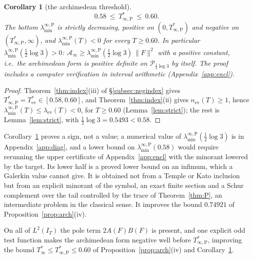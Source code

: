 \documentclass[11pt]{amsart}
\newtheorem{corollary}[theorem]{Corollary}
\theoremstyle{definition}
\theoremstyle{remark}
\newcommand{\IT}{I_T}
\newcommand{\Ainf}{\mathcal A_\infty}
\newcommand{\laminfP}{\lambda^{\infty,\mathrm P}_{\min}}
\begin{document}
\begin{corollary}[the archimedean threshold]\label{cor:Tarch}
\[
0.58\ \le\ T^*_{\infty,\mathrm P}\ \le\ 0.60 .
\]
The bottom $\laminfP$ is strictly decreasing, positive on $(0,T^*_{\infty,\mathrm P})$ and negative on
$(T^*_{\infty,\mathrm P},\infty)$, and $\laminfP(T)<0$ for every $T\ge0.60$. In particular
$\laminfP(\frac12\log3)>0$: $\Ainf\ge\laminfP(\frac12\log3)\,\|F\|^2$ with a positive constant, i.e.\
the archimedean form is positive definite on $\mathcal P_{\frac12\log3}$ by itself. The proof
includes a computer verification in interval arithmetic (Appendix~\ref{app:encl}).
\end{corollary}
\begin{proof}
Theorem~\ref{thm:index}(iii) of \S\ref{subsec:negindex} gives
$T^*_{\infty,\mathrm P}=T^*_{\mathrm{ev}}\in[0.58,0.60]$, and Theorem~\ref{thm:index}(ii) gives
$n_{\mathrm{ev}}(T)\ge1$, hence $\laminfP(T)\le\lambda_{\mathrm{ev}}(T)<0$, for $T\ge0.60$
(Lemma~\ref{lem:strict}); the rest is Lemma~\ref{lem:strict}, with $\frac12\log3=0.5493<0.58$.
\end{proof}
Corollary~\ref{cor:Tarch} proves a sign, not a value; a numerical value of
$\laminfP(\frac12\log3)$ is in Appendix~\ref{app:diag}, and a lower bound on $\laminfP(0.58)$ would
require rerunning the upper certificate of Appendix~\ref{app:encl} with the minorant lowered by the
target. Its lower half is a proved lower bound on an infimum, which a Galerkin value cannot give. It
is obtained not from a Temple or Kato inclusion but from an explicit minorant of the symbol, an exact
finite section and a Schur complement over the tail controlled by the trace of Theorem~\ref{thm:P},
an intermediate problem in the classical sense. It improves the bound $0.74921$ of
Proposition~\ref{prop:arch}(iv).

On all of $L^2(\IT)$ the pole term $2A(F)B(F)$ is present, and one explicit odd test function makes
the archimedean form negative well before $T^*_{\infty,\mathrm P}$, improving the bound
$T^*_\infty\le T^*_{\infty,\mathrm P}\le0.60$ of Proposition~\ref{prop:arch}(iv) and
Corollary~\ref{cor:Tarch}.
\end{document}
